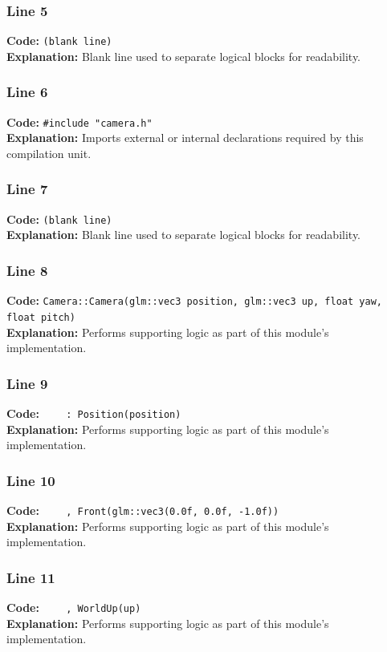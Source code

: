 \documentclass[11pt,a4paper]{article}
\begin{document}
\subsubsection*{Line 5}
\textbf{Code:} \texttt{(blank line)}\\
\textbf{Explanation:} Blank line used to separate logical blocks for readability.

\subsubsection*{Line 6}
\textbf{Code:} \verb|#include "camera.h"|\\
\textbf{Explanation:} Imports external or internal declarations required by this compilation unit.

\subsubsection*{Line 7}
\textbf{Code:} \texttt{(blank line)}\\
\textbf{Explanation:} Blank line used to separate logical blocks for readability.

\subsubsection*{Line 8}
\textbf{Code:} \verb|Camera::Camera(glm::vec3 position, glm::vec3 up, float yaw, float pitch)|\\
\textbf{Explanation:} Performs supporting logic as part of this module's implementation.

\subsubsection*{Line 9}
\textbf{Code:} \verb|    : Position(position)|\\
\textbf{Explanation:} Performs supporting logic as part of this module's implementation.

\subsubsection*{Line 10}
\textbf{Code:} \verb|    , Front(glm::vec3(0.0f, 0.0f, -1.0f))|\\
\textbf{Explanation:} Performs supporting logic as part of this module's implementation.

\subsubsection*{Line 11}
\textbf{Code:} \verb|    , WorldUp(up)|\\
\textbf{Explanation:} Performs supporting logic as part of this module's implementation.
\end{document}
